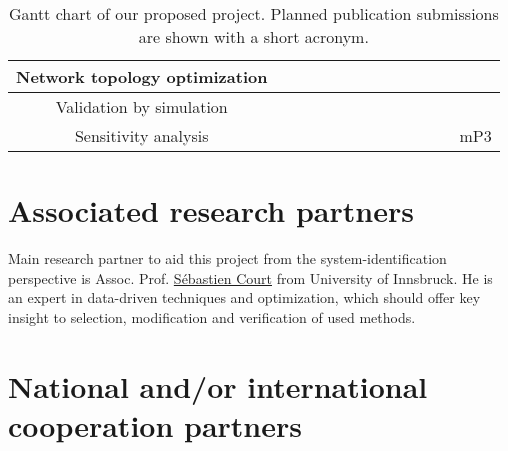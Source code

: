 \documentclass[a4paper,11pt]{scrartcl}
\begin{document}
\begin{table}[h!]
\begin{tabular}{|c|c|c|c|c|c|c|c|c|c|c|c|c|}
        \hline
        Network topology optimization & \cellcolor{yellow!25} & \cellcolor{yellow!25} & \cellcolor{yellow!25} & & \cellcolor{yellow!25} & \cellcolor{yellow!25} & \cellcolor{yellow!25} & & & & & \\
        \hline
        Validation by simulation & & & \cellcolor{yellow!25} & \cellcolor{yellow!25} & \cellcolor{yellow!25} & & \cellcolor{yellow!25} & \cellcolor{yellow!25} & \cellcolor{yellow!25} & & & \\
        \hline
        Sensitivity analysis & & & & \cellcolor{yellow!25} & \cellcolor{yellow!25} & & & & \cellcolor{yellow!25} & \cellcolor{yellow!25} & \cellcolor{yellow!25} & \cellcolor{yellow!25} mP3 \\
        \hline
    \end{tabular}
\caption{Gantt chart of our proposed project. Planned publication submissions are shown with a short acronym.}    
\label{tab:Gantt}
\end{table}


\section{Associated research partners}\label{sec:partners}

Main research partner to aid this project from the system-identification perspective is Assoc. Prof. \href{https://orcid.org/0000-0003-0005-5223}{Sébastien Court} from University of Innsbruck. He is an expert in data-driven techniques and optimization, which should offer key insight to selection, modification and verification of used methods.

\section{National and/or international cooperation partners}\label{sec:cooperations}
\end{document}
